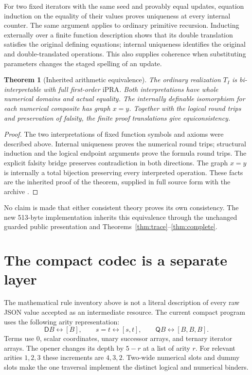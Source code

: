 \documentclass[11pt,letterpaper]{article}
\newtheorem{theorem}{Theorem}[section]
\theoremstyle{definition}
\newcommand{\D}{\mathsf D}
\newcommand{\Q}{\mathsf Q}
\newcommand{\ipra}{\mathrm{iPRA}}
\newcommand{\TI}{T_I}
\begin{document}
For two fixed iterators with the same seed and provably equal updates,
equation induction on the equality of their values proves uniqueness at
every internal counter. The same argument applies to ordinary primitive
recursion. Inducting externally over a finite function description shows
that its double translation satisfies the original defining equations;
internal uniqueness identifies the original and double-translated
operations. This also supplies coherence when substituting parameters
changes the staged spelling of an update.

\begin{theorem}[Inherited arithmetic equivalence]
The ordinary realization $\TI$ is bi-interpretable with full first-order
$\ipra$. Both interpretations have whole numerical domains and actual
equality. The internally definable isomorphism for each numerical composite
has graph $x=y$. Together with the logical round trips and preservation of
falsity, the finite proof translations give equiconsistency.
\end{theorem}
\begin{proof}
The two interpretations of fixed function symbols and axioms were described
above. Internal uniqueness proves the numerical round trips; structural
induction and the logical endpoint arguments prove the formula round trips.
The explicit falsity bridge preserves contradiction in both directions.
The graph $x=y$ is internally a total bijection preserving every interpreted
operation. These facts are the inherited proof of the theorem, supplied
in full source form with the archive \cite{bridge,recursion}.
\end{proof}
No claim is made that either consistent theory proves its own consistency.
The new 513-byte implementation inherits this equivalence through the
unchanged guarded public presentation and Theorems~\ref{thm:trace}--\ref{thm:complete}.

\section{The compact codec is a separate layer}\label{sec:codec}
The mathematical rule inventory above is not a literal description of
every raw JSON value accepted as an intermediate resource. The current
compact program uses the following arity representation:
\[
 \D B\longleftrightarrow[B],\qquad
 s=t\longleftrightarrow[s,t],\qquad
 \Q B\longleftrightarrow[B,B,B].
\]
Terms use $0$, scalar coordinates, unary successor arrays, and ternary
iterator arrays. The opener changes its depth by $5-r$ at a list of arity
$r$. For relevant arities $1,2,3$ these increments are $4,3,2$.
Two-wide numerical slots and dummy slots make the one traversal implement
the distinct logical and numerical binders.
\end{document}
